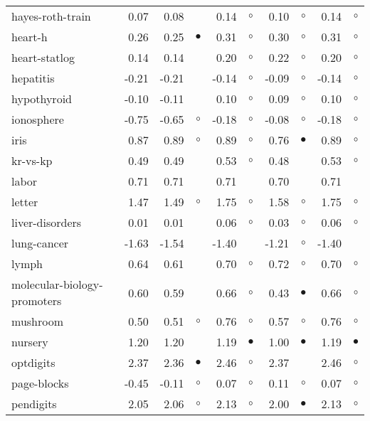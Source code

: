 {\begin{longtable}{lrr@{\hspace{0.1cm}}cr@{\hspace{0.1cm}}cr@{\hspace{0.1cm}}cr@{\hspace{0.1cm}}c}
hayes-roth-train &  0.07 &  0.08 &           &  0.14 &   $\circ$ &  0.10 &    $\circ$ &  0.14 &   $\circ$\\
heart-h &  0.26 &  0.25 & $\bullet$ &  0.31 &   $\circ$ &  0.30 &    $\circ$ &  0.31 &   $\circ$\\
heart-statlog &  0.14 &  0.14 &           &  0.20 &   $\circ$ &  0.22 &    $\circ$ &  0.20 &   $\circ$\\
hepatitis & -0.21 & -0.21 &           & -0.14 &   $\circ$ & -0.09 &    $\circ$ & -0.14 &   $\circ$\\
hypothyroid & -0.10 & -0.11 &           &  0.10 &   $\circ$ &  0.09 &    $\circ$ &  0.10 &   $\circ$\\
ionosphere & -0.75 & -0.65 &   $\circ$ & -0.18 &   $\circ$ & -0.08 &    $\circ$ & -0.18 &   $\circ$\\
iris &  0.87 &  0.89 &   $\circ$ &  0.89 &   $\circ$ &  0.76 &  $\bullet$ &  0.89 &   $\circ$\\
kr-vs-kp &  0.49 &  0.49 &           &  0.53 &   $\circ$ &  0.48 &            &  0.53 &   $\circ$\\
labor &  0.71 &  0.71 &           &  0.71 &           &  0.70 &            &  0.71 &          \\
letter &  1.47 &  1.49 &   $\circ$ &  1.75 &   $\circ$ &  1.58 &    $\circ$ &  1.75 &   $\circ$\\
liver-disorders &  0.01 &  0.01 &           &  0.06 &   $\circ$ &  0.03 &    $\circ$ &  0.06 &   $\circ$\\
lung-cancer & -1.63 & -1.54 &           & -1.40 &           & -1.21 &    $\circ$ & -1.40 &          \\
lymph &  0.64 &  0.61 &           &  0.70 &   $\circ$ &  0.72 &    $\circ$ &  0.70 &   $\circ$\\
molecular-biology-promoters &  0.60 &  0.59 &           &  0.66 &   $\circ$ &  0.43 &  $\bullet$ &  0.66 &   $\circ$\\
mushroom &  0.50 &  0.51 &   $\circ$ &  0.76 &   $\circ$ &  0.57 &    $\circ$ &  0.76 &   $\circ$\\
nursery &  1.20 &  1.20 &           &  1.19 & $\bullet$ &  1.00 &  $\bullet$ &  1.19 & $\bullet$\\
optdigits &  2.37 &  2.36 & $\bullet$ &  2.46 &   $\circ$ &  2.37 &            &  2.46 &   $\circ$\\
page-blocks & -0.45 & -0.11 &   $\circ$ &  0.07 &   $\circ$ &  0.11 &    $\circ$ &  0.07 &   $\circ$\\
pendigits &  2.05 &  2.06 &   $\circ$ &  2.13 &   $\circ$ &  2.00 &  $\bullet$ &  2.13 &   $\circ$\\

\end{longtable}}
